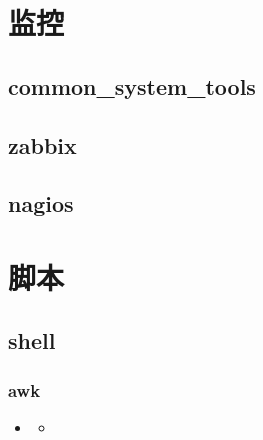 \documentclass[letterpaper,10pt,english]{sphinxmanual}
\begin{document}
\chapter{监控}
\label{\detokenize{monitor/readme:id1}}\label{\detokenize{monitor/readme::doc}}

\section{common\_system\_tools}
\label{\detokenize{monitor/common_system_tools:common-system-tools}}\label{\detokenize{monitor/common_system_tools::doc}}

\section{zabbix}
\label{\detokenize{monitor/zabbix:zabbix}}\label{\detokenize{monitor/zabbix::doc}}

\section{nagios}
\label{\detokenize{monitor/nagios:nagios}}\label{\detokenize{monitor/nagios::doc}}

\chapter{脚本}
\label{\detokenize{scripts/readme:id1}}\label{\detokenize{scripts/readme::doc}}

\section{shell}
\label{\detokenize{scripts/shell/readme:shell}}\label{\detokenize{scripts/shell/readme::doc}}

\subsection{awk}
\label{\detokenize{scripts/shell/awk:awk}}\label{\detokenize{scripts/shell/awk::doc}}
\begin{sphinxShadowBox}
\begin{itemize}
\item {} 
\label{\detokenize{scripts/shell/awk:id1}}{\hyperref[\detokenize{scripts/shell/awk:awk}]{}}
\begin{itemize}
\item {} 
\label{\detokenize{scripts/shell/awk:id2}}{\hyperref[\detokenize{scripts/shell/awk:text}]{}}

\end{itemize}

\end{itemize}
\end{sphinxShadowBox}
\end{document}
